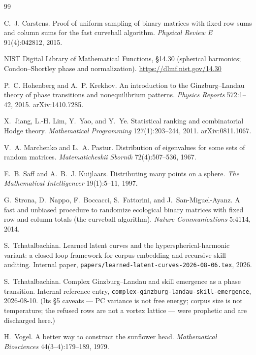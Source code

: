 \documentclass[11pt,a4paper]{article}
\theoremstyle{plain}
\theoremstyle{remark}
\theoremstyle{plain}
\begin{document}
\begin{thebibliography}{99}

 C.~J. Carstens. Proof of uniform sampling of binary matrices with fixed row sums and column sums for the fast curveball algorithm. \emph{Physical Review E} 91(4):042812, 2015.

 NIST Digital Library of Mathematical Functions, \S14.30 (spherical harmonics; Condon--Shortley phase and normalization). \url{https://dlmf.nist.gov/14.30}

 P.~C. Hohenberg and A.~P. Krekhov. An introduction to the Ginzburg--Landau theory of phase transitions and nonequilibrium patterns. \emph{Physics Reports} 572:1--42, 2015. arXiv:1410.7285.

 X.~Jiang, L.-H. Lim, Y.~Yao, and Y.~Ye. Statistical ranking and combinatorial Hodge theory. \emph{Mathematical Programming} 127(1):203--244, 2011. arXiv:0811.1067.

 V.~A. Marchenko and L.~A. Pastur. Distribution of eigenvalues for some sets of random matrices. \emph{Matematicheskii Sbornik} 72(4):507--536, 1967.

 E.~B. Saff and A.~B.~J. Kuijlaars. Distributing many points on a sphere. \emph{The Mathematical Intelligencer} 19(1):5--11, 1997.

 G.~Strona, D.~Nappo, F.~Boccacci, S.~Fattorini, and J.~San-Miguel-Ayanz. A fast and unbiased procedure to randomize ecological binary matrices with fixed row and column totals (the curveball algorithm). \emph{Nature Communications} 5:4114, 2014.

 S.~Tchatalbachian. Learned latent curves and the hyperspherical-harmonic variant: a closed-loop framework for corpus embedding and recursive skill auditing. Internal paper, \texttt{papers/learned-latent-curves-2026-08-06.tex}, 2026.

 S.~Tchatalbachian. Complex Ginzburg--Landau and skill emergence as a phase transition. Internal reference entry, \texttt{complex-ginzburg-landau-skill-emergence}, 2026-08-10. (Its \S5 caveats --- PC variance is not free energy; corpus size is not temperature; the refused rows are not a vortex lattice --- were prophetic and are discharged here.)

 H.~Vogel. A better way to construct the sunflower head. \emph{Mathematical Biosciences} 44(3--4):179--189, 1979.

\end{thebibliography}
\end{document}
